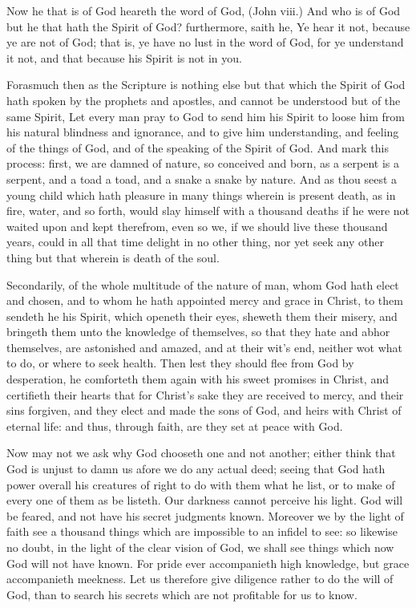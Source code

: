 Now he that is of God heareth the word of God, (John 
viii.) And who is of God but he that hath the Spirit of God? 
furthermore, saith he, Ye hear it not, because ye are not 
of God; that is, ye have no lust in the word of God, for ye 
understand it not, and that because his Spirit is not in you. 

Forasmuch then as the Scripture is nothing else but that 
which the Spirit of God hath spoken by the prophets and 
apostles, and cannot be understood but of the same Spirit, 
Let every man pray to God to send him his Spirit to loose 
him from his natural blindness and ignorance, and to give 
him understanding, and feeling of the things of God, and of 
the speaking of the Spirit of God. And mark this process: 
first, we are damned of nature, so conceived and born, as 
a serpent is a serpent, and a toad a toad, and a snake a 
snake by nature. And as thou seest a young child which 
hath pleasure in many things wherein is present death, as in 
fire, water, and so forth, would slay himself with a thousand 
deaths if he were not waited upon and kept therefrom,
even so we, if we should live these thousand years, could in
all that time delight in no other thing, nor yet seek any
other thing but that wherein is death of the soul. 

Secondarily, of the whole multitude of the nature of man, 
whom God hath elect and chosen, and to whom he hath 
appointed mercy and grace in Christ, to them sendeth he his 
Spirit, which openeth their eyes, sheweth them their misery, 
and bringeth them unto the knowledge of themselves, so 
that they hate and abhor themselves, are astonished and 
amazed, and at their wit's end, neither wot what to do, or 
where to seek health. Then lest they should flee from God 
by desperation, he comforteth them again with his sweet 
promises in Christ, and certifieth their hearts that for Christ's 
sake they are received to mercy, and their sins forgiven, 
and they elect and made the sons of God, and heirs with 
Christ of eternal life: and thus, through faith, are they set 
at peace with God. 

Now may not we ask why God chooseth one and not 
another; either think that God is unjust to damn us afore 
we do any actual deed; seeing that God hath power overall 
his creatures of right to do with them what he list, or to 
make of every one of them as be listeth. Our darkness 
cannot perceive his light. God will be feared, and not have 
his secret judgments known. Moreover we by the light of 
faith see a thousand things which are impossible to an infidel
to see: so likewise no doubt, in the light of the clear 
vision of God, we shall see things which now God will not 
have known. For pride ever accompanieth high knowledge, 
but grace accompanieth meekness. Let us therefore give 
diligence rather to do the will of God, than to search his 
secrets which are not profitable for us to know. 

